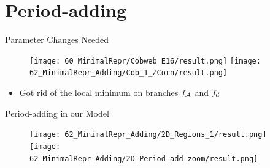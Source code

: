 \section{Period-adding}

\begin{frame}{Parameter Changes Needed}
	\vspace{-1em}
	\begin{figure}
		\texttt{[image: 60\_MinimalRepr/Cobweb\_E16/result.png]}
		\texttt{[image: 62\_MinimalRepr\_Adding/Cob\_1\_ZCorn/result.png]}
	\end{figure}
	\begin{itemize}
		\item Got rid of the local minimum on branches $f_{\mathcal{A}}$ and $f_{\mathcal{C}}$
	\end{itemize}
\end{frame}

\begin{frame}{Period-adding in our Model}
	\begin{figure}
		\texttt{[image: 62\_MinimalRepr\_Adding/2D\_Regions\_1/result.png]}
		\quad
		\texttt{[image: 62\_MinimalRepr\_Adding/2D\_Period\_add\_zoom/result.png]}
	\end{figure}
\end{frame}

